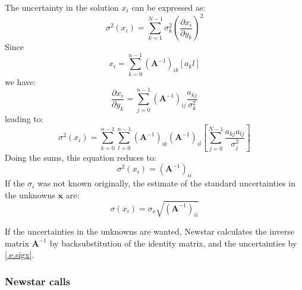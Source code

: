 The uncertainty in the solution $x_{i}$ can be expressed as:
\begin{equation}
	\sigma^{2}\left(x_{i}\right) =
		\sum_{k=1}^{N-1}\sigma_{k}^{2}
	{\left(\frac{\partial{x_{i}}}{\partial{y_{k}}}\right)}^{2}
\end{equation}
Since
\begin{equation}
	x_{i}=\sum_{k=0}^{n-1}{\left(\mathbf{A}^{-1}\right)}_{ik}
		\left[a_{k}l\right]
\end{equation}
we have:
\begin{equation}
	{\frac{\partial{x_{i}}}{\partial{y_{k}}}}=
	\sum_{j=0}^{n-1}{\left(\mathbf{A}^{-1}\right)}_{ij}
		\frac{a_{kj}}{\sigma_{k}^{2}}
\end{equation}
leading to:
\begin{equation}
	\sigma^{2}\left(x_{i}\right) =
		\sum_{k=0}^{n-1}\sum_{l=0}^{n-1}
		{\left(\mathbf{A}^{-1}\right)}_{ik}
		{\left(\mathbf{A}^{-1}\right)}_{il}
		\left[\sum_{j=0}^{N-1}
			\frac{a_{kj}a_{lj}}{\sigma_{j}^{2}}\right]
\end{equation}
Doing the sums, this equation reduces to:
\begin{equation}
	\sigma^{2}\left(x_{i}\right) =
		{\left(\mathbf{A}^{-1}\right)}_{ii}
\end{equation}
If the $\sigma_{i}$ was not known originally, the estimate of the standard
uncertainties in the unknowns $\mathbf{x}$ are:
\begin{equation}
	\sigma\left(x_{i}\right) = \sigma_{o}
		\sqrt{{\left(\mathbf{A}^{-1}\right)}_{ii}}
\label{.e.sigx}
\end{equation}

If the uncertainties in the unknowns are wanted, Newstar calculates the
inverse matrix $\mathbf{A}^{-1}$ by backsubstitution of the identity matrix,
and the uncertainties by \eqref{.e.sigx}.

\subsubsection{Newstar calls}
\label{.ss.ncalls}

